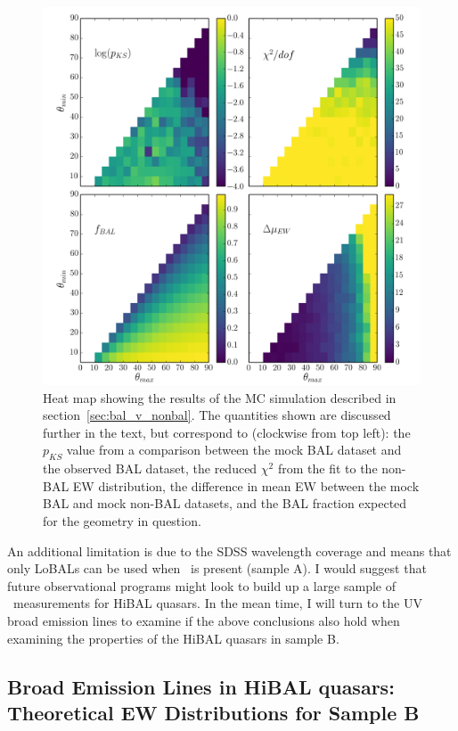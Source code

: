 \begin{figure} %
\centering
\includegraphics[width=1.0\textwidth]{figures/ewpaper/mesh4_ew_o3_max_sdss.png}
\caption
{
Heat map showing the results of the MC simulation described in 
section~\ref{sec:bal_v_nonbal}. The quantities shown are discussed 
further in the text, but correspond to (clockwise from top left):
the $p_{KS}$ value from a comparison between the mock BAL dataset
and the observed BAL dataset, the reduced $\chi^2$ from the fit to
the non-BAL EW distribution, the difference in mean EW between the 
mock BAL and mock non-BAL datasets, and the BAL fraction expected
for the geometry in question.
}
\label{fig:contour}
\end{figure} %

An additional limitation is due to the SDSS wavelength coverage
and means that only LoBALs can be used when \ewo\ is present (sample A).
I would suggest that future observational programs might 
look to build up a large sample of \ewo\ measurements for HiBAL
quasars. In the mean time, I will turn to the UV broad emission
lines to examine if the above conclusions also hold
when examining the properties of the HiBAL quasars in sample B.

\subsection{Broad Emission Lines in HiBAL quasars: Theoretical EW Distributions for Sample B}
\label{sec:hibal_v_nonbal}

